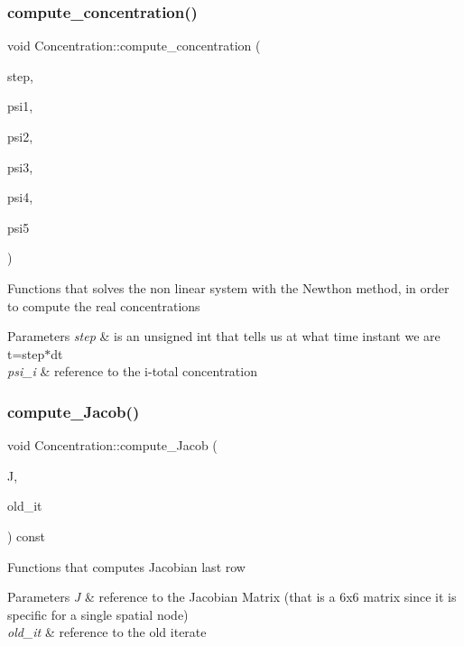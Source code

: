 \subsubsection{\texorpdfstring{compute\+\_\+concentration()}{compute\_concentration()}}
{\footnotesize\ttfamily void Concentration\+::compute\+\_\+concentration (\begin{DoxyParamCaption}\item[{unsigned int}]{step,  }\item[{const Vector \&}]{psi1,  }\item[{const Vector \&}]{psi2,  }\item[{const Vector \&}]{psi3,  }\item[{const Vector \&}]{psi4,  }\item[{const Vector \&}]{psi5 }\end{DoxyParamCaption})}

Functions that solves the non linear system with the Newthon method, in order to compute the real concentrations 
\begin{DoxyParams}{Parameters}
{\em step} & is an unsigned int that tells us at what time instant we are t=step$\ast$dt \\
\hline
{\em psi\+\_\+i} & reference to the i-\/total concentration \\
\hline
\end{DoxyParams}
\mbox{\label{classConcentration_aac5f795f4721dc2cd15daaf9600fe24d}} 
\subsubsection{\texorpdfstring{compute\+\_\+\+Jacob()}{compute\_Jacob()}}
{\footnotesize\ttfamily void Concentration\+::compute\+\_\+\+Jacob (\begin{DoxyParamCaption}\item[{Eigen\+::\+Matrix\+Xd \&}]{J,  }\item[{const Vector \&}]{old\+\_\+it }\end{DoxyParamCaption}) const}

Functions that computes Jacobian last row 
\begin{DoxyParams}{Parameters}
{\em J} & reference to the Jacobian Matrix (that is a 6x6 matrix since it is specific for a single spatial node) \\
\hline
{\em old\+\_\+it} & reference to the old iterate \\
\hline
\end{DoxyParams}
\mbox{\label{classConcentration_ab00a6f7838bebf7cddaedbab247192b7}} 
